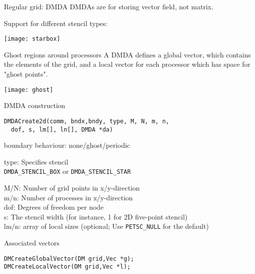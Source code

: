 

\begin{longversion}
\begin{numberedframe}{Regular grid: DMDA}
DMDAs are for storing vector field, not matrix.

Support for different stencil types:

\texttt{[image: starbox]}
\end{numberedframe}

\begin{numberedframe}{Ghost regions around processors}
A DMDA defines a global vector, which contains the elements of the grid,
and a local vector for each processor which
has space for "ghost points".

\texttt{[image: ghost]}
\end{numberedframe}

\begin{numberedframe}{DMDA construction}
\begin{lstlisting}
DMDACreate2d(comm, bndx,bndy, type, M, N, m, n, 
  dof, s, lm[], ln[], DMDA *da)
\end{lstlisting}
\footnotesize
{} boundary behaviour: none/ghost/periodic

type: Specifies stencil\\
\lstinline{DMDA_STENCIL_BOX} or \lstinline{DMDA_STENCIL_STAR}

M/N: Number of grid points in x/y-direction\\
m/n: Number of processes in x/y-direction\\
dof: Degrees of freedom per node\\
s: The stencil width (for instance, 1 for 2D five-point stencil)\\
lm/n: array of local sizes (optional; 
Use \lstinline{PETSC_NULL} for the default)
\end{numberedframe}

\begin{numberedframe}{Associated vectors}
\begin{lstlisting}
DMCreateGlobalVector(DM grid,Vec *g);
DMCreateLocalVector(DM grid,Vec *l);


\end{lstlisting}
\end{numberedframe}
\end{longversion}
